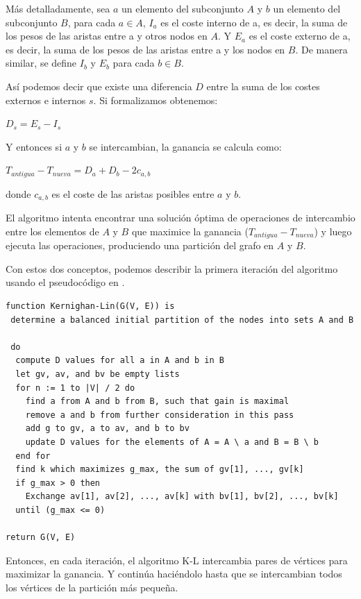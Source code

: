 Más detalladamente, sea $a$ un elemento del subconjunto $A$ y $b$ un elemento del subconjunto $B$, para cada $a \in A$, $I_{a}$ es el coste interno de a, es decir, la suma de los pesos de las aristas entre a y otros nodos en $A$. Y $E_{a}$ es el coste externo de a, es decir, la suma de los pesos de las aristas entre a y los nodos en $B$. De manera similar, se define $I_{b}$ y $E_{b}$ para cada $b \in B$.

Así podemos decir que existe una diferencia $D$ entre la suma de los costes externos e internos $s$. Si formalizamos obtenemos:

\begin{center}
	$D_{s} = E_{s} - I_{s}$
\end{center}

Y entonces si $a$ y $b$ se intercambian, la ganancia se calcula como:

\begin{center}\label{ganancia}
	$T_{antigua} - T_{nueva} = D_{a} + D_{b} - 2c_{a, b}$ 
\end{center}

donde $c_{a, b}$ es el coste de las aristas posibles entre $a$ y $b$.

El algoritmo intenta encontrar una solución óptima de operaciones de intercambio entre los elementos de $A$ y $B$ que maximice la ganancia ($T_{antigua} - T_{nueva}$) y luego ejecuta las operaciones, produciendo una partición del grafo en $A$ y $B$.

Con estos dos conceptos, podemos describir la primera iteración del algoritmo usando el pseudocódigo en \cite{Ravikumar}.

\begin{lstlisting}[frame=single] 
function Kernighan-Lin(G(V, E)) is
 determine a balanced initial partition of the nodes into sets A and B

 do
  compute D values for all a in A and b in B
  let gv, av, and bv be empty lists
  for n := 1 to |V| / 2 do
    find a from A and b from B, such that gain is maximal
    remove a and b from further consideration in this pass
	add g to gv, a to av, and b to bv
	update D values for the elements of A = A \ a and B = B \ b
  end for
  find k which maximizes g_max, the sum of gv[1], ..., gv[k]
  if g_max > 0 then
    Exchange av[1], av[2], ..., av[k] with bv[1], bv[2], ..., bv[k]
  until (g_max <= 0)  
    
return G(V, E) 
\end{lstlisting}

Entonces, en cada iteración, el algoritmo K-L intercambia pares de vértices para maximizar la ganancia. Y continúa haciéndolo hasta que se intercambian todos los vértices de la partición más pequeña. 

